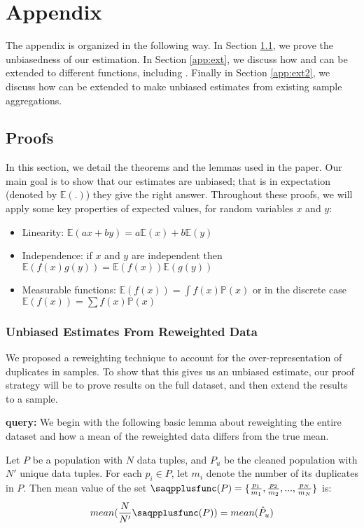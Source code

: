 \clearpage
\newpage
\section{Appendix}
The appendix is organized in the following way.
In Section \ref{app:proof}, we prove the unbiasedness of our estimation.
In Section \ref{app:ext}, we discuss how \sampleclean and \bias can be extended to different functions, including \varfunc.
Finally in Section \ref{app:ext2}, we discuss how \bias can be extended to make unbiased estimates from existing sample aggregations.

\subsection{Proofs}\label{app:proof}
In this section, we detail the theorems and the lemmas used in the paper.
Our main goal is to show that our estimates are unbiased; that is in expectation (denoted by $\mathbb{E(.)}$) they give the right answer.
Throughout these proofs, we will apply some key properties of expected values, for random variables $x$ and $y$:
\begin{itemize}
\item Linearity: $\mathbb{E}(ax+by)=a\mathbb{E}(x)+b\mathbb{E}(y)$
\item Independence: if $x$ and $y$ are independent then \\$\mathbb{E}(f(x)g(y))=\mathbb{E}(f(x))\mathbb{E}(g(y))$
\item Measurable functions: $\mathbb{E}(f(x))= \int f(x) \mathbb{P}(x)$ or in the discrete case $\mathbb{E}(f(x))= \sum f(x) \mathbb{P}(x)$
\end{itemize}

\subsubsection{Unbiased Estimates From Reweighted Data}
We proposed a reweighting technique to account for the over-representation of duplicates in samples.
To show that this gives us an unbiased estimate, our proof strategy will be to prove results on the full dataset, and then extend the results to a sample.

{\noindent \bf \avgfunc query:}
We begin with the following basic lemma about reweighting the entire dataset and how a mean of the reweighted data differs from the true mean.

\setcounter{lemma}{0}
\begin{lemma}
Let $P$ be a population with $N$ data tuples, and $P_{u}$ be the cleaned population with $N'$ unique data tuples.
For each $p_{i}\in P$, let $m_i$ denote the number of its duplicates in $P$.
Then mean value of the set $\saqpplusfunc(P)=\{\frac{p_{1}}{m_{1}},\frac{p_{2}}{m_{2}},...,\frac{p_{N}}{m_{N}}\}$ is:
\[
mean(\frac{N}{N'}\saqpplusfunc(P))= mean(\hat{P}_{u})
\]
\end{lemma}

